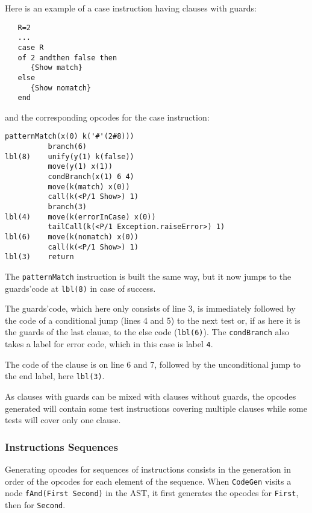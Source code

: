 \documentclass[a4paper]{memoir}
\begin{document}
Here is an example of a case instruction having clauses with guards:
\begin{lstlisting}
   R=2
   ...
   case R
   of 2 andthen false then
      {Show match}
   else
      {Show nomatch}
   end
\end{lstlisting}

and the corresponding opcodes for the case instruction:

\lstset{numbers=left, numberstyle=\tiny, stepnumber=1, numbersep=5pt}
\begin{lstlisting}[firstnumber=1]
          patternMatch(x(0) k('#'(2#8)))
          branch(6)
lbl(8)    unify(y(1) k(false))
          move(y(1) x(1))
          condBranch(x(1) 6 4)
          move(k(match) x(0))
          call(k(<P/1 Show>) 1)
          branch(3)
lbl(4)    move(k(errorInCase) x(0))
          tailCall(k(<P/1 Exception.raiseError>) 1)
lbl(6)    move(k(nomatch) x(0))
          call(k(<P/1 Show>) 1)
lbl(3)    return
\end{lstlisting}
\lstset{numbers=none}
The \lstinline!patternMatch! instruction is built the same way, but
it now jumps to the guards'code at \lstinline!lbl(8)! in case of
success. 

The guards'code, which here only consists of line 3, is immediately
followed by the code of a conditional jump (lines 4 and 5) to the next test or, if as here it is the guards
of the last clause, to the else code (\lstinline!lbl(6)!). The \lstinline!condBranch!
also takes a label for error code, which in this case is label \lstinline!4!.

The code of the clause is on line 6 and 7, followed by the unconditional jump to
the end label, here \lstinline!lbl(3)!.

As clauses with guards can be mixed with clauses without guards, the opcodes
generated will contain some test instructions covering multiple clauses while
some tests will cover only one clause.

\subsubsection{Instructions Sequences}
Generating opcodes for sequences of instructions consists in the generation in order of the opcodes for each element of the sequence. 
When \lstinline!CodeGen! visits a node \lstinline!fAnd(First Second)! in the AST, it first generates the opcodes for \lstinline!First!, then for \lstinline!Second!.
\end{document}
